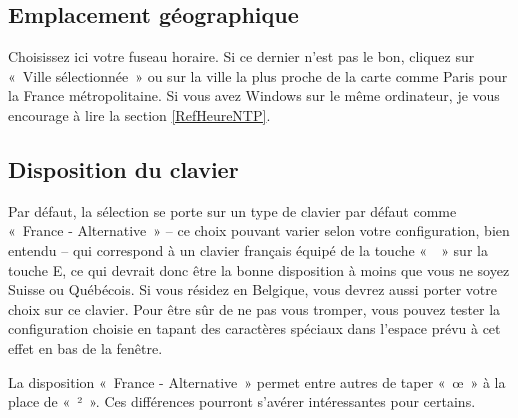 \subsection{Emplacement géographique}
Choisissez ici votre fuseau horaire. Si ce dernier n'est pas le bon, cliquez sur «~Ville sélectionnée~» ou sur la ville la plus proche de la carte comme Paris pour la France métropolitaine. Si vous avez Windows sur le même ordinateur, je vous encourage à lire la section \ref{RefHeureNTP}.
\subsection{Disposition du clavier}
Par défaut, la sélection se porte sur un type de clavier par défaut comme «~France - Alternative~» -- ce choix pouvant varier selon votre configuration, bien entendu -- qui correspond à un clavier français équipé de la touche «~\texteuro{}~» sur la touche E, ce qui devrait donc être la bonne disposition à moins que vous ne soyez Suisse ou Québécois. Si vous résidez en Belgique, vous devrez aussi porter votre choix sur ce clavier. Pour être sûr de ne pas vous tromper, vous pouvez tester la configuration choisie en tapant des caractères spéciaux dans l'espace prévu à cet effet en bas de la fenêtre.
\begin{nota}
La disposition «~France - Alternative~» permet entre autres de taper «~œ~» à la place de «~²~». Ces différences pourront s'avérer intéressantes pour certains.
\end{nota}
